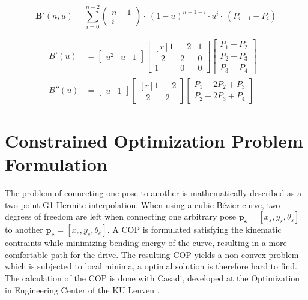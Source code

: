 \begin{equation} \label{eq:BezierCurveGeneralDerivative}
\bm{B}'(n,u) = \sum_{i=0}^{n-2}
\begin{pmatrix} n-1 \\ i \end{pmatrix} \cdot~
(1-u)^{n-1-i} \cdot u^i
\cdot~( P_{i+1}-P_{i})
\end{equation}


\begin{align}
B'(u)  &=
\begin{bmatrix}
u^2 & u & 1  
\end{bmatrix}
\begin{bmatrix*}[r]
 1 & -2 & 1\\ 
-2 &  2 & 0\\ 
 1 &  0 & 0 
\end{bmatrix*}
\begin{bmatrix}
P_1-P_2  \\ P_2- P_3  \\ P_3- P_4 
\end{bmatrix} \label{eq:BezierCurveMatFirstDev}\\
B''(u) & =
\begin{bmatrix}
u & 1  
\end{bmatrix}
\begin{bmatrix*}[r]
 1 & -2\\ 
-2 &  2
\end{bmatrix*}
\begin{bmatrix}
P_1- 2 P_2 + P_3  \\ P_2 - 2 P_3 + P_4 
\end{bmatrix}&  \label{eq:BezierCurveMatSecondDev}
\end{align}

\section{Constrained Optimization Problem Formulation}
The problem of connecting one pose to another is mathematically described as a two point G1 Hermite interpolation. When using a cubic Bézier curve, two degrees of freedom are left when connecting one arbitrary pose $\bm{p_s}=[x_s, y_s, \theta_s]$ to another $\bm{p_e}=[x_e, y_e, \theta_e]$. A COP is formulated satisfying the kinematic contraints while minimizing bending energy of the curve, resulting in a more comfortable path for the drive. The resulting COP yields a non-convex problem which is subjected to local minima, a optimal solution is therefore hard to find. The calculation of the COP is done with Casadi, developed at the Optimization in Engineering Center of the KU Leuven \cite{Andersson2013}. 


